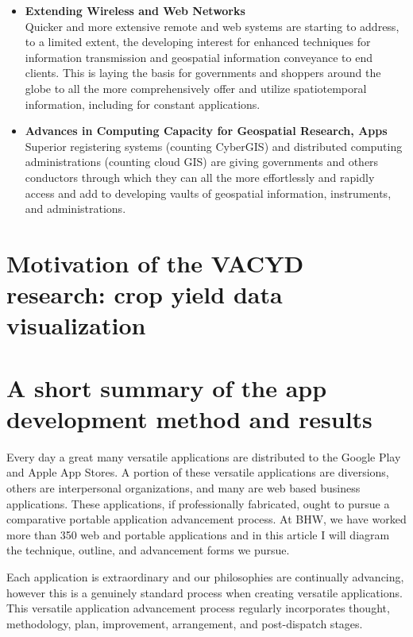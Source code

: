 \begin{itemize}
  \item  \textbf{Extending Wireless and Web Networks} \\
 Quicker and more extensive remote and web systems are starting to address, to a limited extent, the developing interest for enhanced techniques for information transmission and geospatial information conveyance to end clients. This is laying the basis for governments and shoppers around the globe to all the more comprehensively offer and utilize spatiotemporal information, including for constant applications. 
  
  \item  \textbf{Advances in Computing Capacity for Geospatial Research, Apps} \\
 Superior registering systems (counting CyberGIS) and distributed computing administrations (counting cloud GIS) are giving governments and others conductors through which they can all the more effortlessly and rapidly access and add to developing vaults of geospatial information, instruments, and administrations.
  
\end{itemize}

\section{Motivation of the VACYD research: crop yield data visualization}

\section{A short summary of the app development method and results}

Every day a great many versatile applications are distributed to the Google Play and Apple App Stores. A portion of these versatile applications are diversions, others are interpersonal organizations, and many are web based business applications. These applications, if professionally fabricated, ought to pursue a comparative portable application advancement process. At BHW, we have worked more than 350 web and portable applications and in this article I will diagram the technique, outline, and advancement forms we pursue. 

Each application is extraordinary and our philosophies are continually advancing, however this is a genuinely standard process when creating versatile applications. This versatile application advancement process regularly incorporates thought, methodology, plan, improvement, arrangement, and post-dispatch stages.

